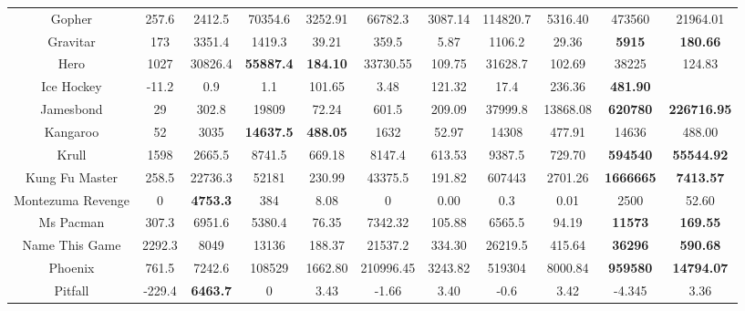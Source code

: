 \documentclass[nohyperref]{article}
\theoremstyle{plain}
\begin{document}
\begin{table}[!hb]
\begin{center}
\begin{tabular}{ |c| c| c| c c| c c| c c| c c|}
 Gopher  & 257.6 & 2412.5           & 70354.6 & 3252.91    & 66782.3 & 3087.14 & 114820.7 & 5316.40                  &473560           &21964.01    \\
 Gravitar & 173 & 3351.4            & 1419.3  & 39.21   & 359.5      & 5.87    & 1106.2   & 29.36                                 &\textbf{5915}             &\textbf{180.66}   \\
 Hero   & 1027 & 30826.4            & \textbf{55887.4} & \textbf{184.10}   & 33730.55  & 109.75  & 31628.7 & 102.69          &38225            &124.83    \\
 Ice Hockey & -11.2 & 0.9           & 1.1    & 101.65   & 3.48      & 121.32   & 17.4    & 236.36                            &\textbf{481.90}   \\
 Jamesbond  & 29    & 302.8         & 19809 & 72.24   & 601.5     & 209.09   & 37999.8 & 13868.08                   &\textbf{620780}          &\textbf{226716.95}    \\
 Kangaroo   & 52    & 3035          & \textbf{14637.5} & \textbf{488.05} & 1632    & 52.97    & 14308   & 477.91              &14636           &488.00    \\
 Krull     & 1598   & 2665.5        & 8741.5  & 669.18 & 8147.4  & 613.53   & 9387.5  &  729.70                        &\textbf{594540}          &\textbf{55544.92}     \\
 Kung Fu Master & 258.5 & 22736.3   & 52181 & 230.99 & 43375.5 & 191.82 & 607443 & 2701.26                  &\textbf{1666665}          &\textbf{7413.57}         \\
 Montezuma Revenge&0&\textbf{4753.3}& 384   & 8.08   & 0       & 0.00   & 0.3    & 0.01                                       &2500            &52.60   \\
 Ms Pacman  & 307.3 & 6951.6        & 5380.4  & 76.35   & 7342.32 & 105.88 & 6565.5   & 94.19                         &\textbf{11573}           &\textbf{169.55}    \\
 Name This Game & 2292.3 & 8049     & 13136 & 188.37   & 21537.2 & 334.30 & 26219.5 & 415.64                          &\textbf{36296}           &\textbf{590.68}    \\
 Phoenix & 761.5 & 7242.6  & 108529 & 1662.80   & 210996.45  & 3243.82 & 519304 & 8000.84                            &\textbf{959580}          &\textbf{14794.07}  \\
 Pitfall & -229.4 & \textbf{6463.7} & 0      & 3.43      & -1.66      & 3.40    & -0.6   & 3.42                                 &-4.345            &3.36 \\

\end{tabular}
\end{center}
\end{table}
\end{document}
